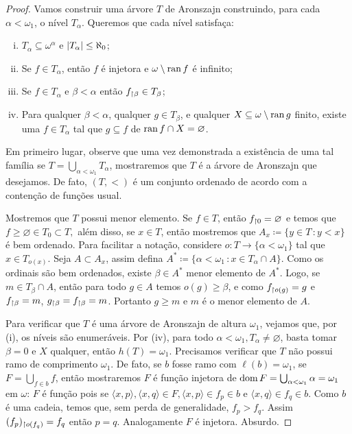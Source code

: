 \documentclass[a4paper]{article}
\begin{document}
\begin{proof}
  Vamos construir uma árvore \(T\) de Aronszajn construindo, para cada
  \(\alpha<\omega_1\), o nível \(T_\alpha\). Queremos que cada nível satisfaça:
  \begin{enumerate}[(i)]
    \item \(T_{\alpha} \subseteq \omega^{\alpha}\) e \(\vert T_{\alpha} \vert \le \aleph_0\);
    \item Se \(f \in T_{\alpha}\), então \(f\) é injetora e \(\omega\setminus \operatorname{ran} f\) é infinito;
    \item Se \(f \in T_{\alpha}\) e \(\beta < \alpha\) então \(f_{\upharpoonright \beta} \in T_{\beta}\);
    \item Para qualquer \(\beta < \alpha\), qualquer \(g \in T_{\beta}\), e
    qualquer \(X \subseteq \omega\setminus \operatorname{ran} g\) finito, existe uma \(f \in
    T_{\alpha}\) tal que \(g \subseteq f\) de \(\operatorname{ran} f \cap X = \varnothing\).
    \end{enumerate}

    Em primeiro lugar, observe que uma vez demonstrada a existência de uma tal
    família se \(T=\bigcup_{\alpha<\omega_1} T_\alpha\), mostraremos que \(T\) é
    a árvore  de Aronszajn que desejamos. De fato, \((T,<)\) é um conjunto
    ordenado de acordo com a contenção de funções usual.
    
    Mostremos que \(T\) possui menor elemento. Se \(f\in T\), então
    \(f_{\upharpoonright 0}=\varnothing\) e temos que \(f\geq\varnothing\in T_0\subset
    T,\) além disso,  se \(x\in T\), então mostremos que \(A_x\coloneqq\{y\in
    T\,\colon y<x\}\) é bem ordenado. Para facilitar a notação, considere
    \(o\colon T\rightarrow \{\alpha<\omega_1\}\) tal que \(x\in T_{o(x)}\). Seja
    \(A\subset A_x\), assim defina \(A^\ast\coloneqq \{\alpha<\omega_1\,\colon
    x\in T_\alpha\cap A\}\). 
    Como os ordinais são bem ordenados, existe \(\beta\in A^\ast\) menor
    elemento de \(A^\ast\).
    Logo, se \(m\in T_\beta\cap A\), então para todo \(g\in A\) temos
    \(o(g)\geq\beta\),  e como \(f_{\upharpoonright o(g)}=g\) e \(f_{\upharpoonright \beta}=m\),
    \(g_{\upharpoonright \beta}=f_{\upharpoonright \beta}=m\). Portanto \(g\geq m\) e \(m\) é o
    menor elemento de \(A\).
    
    Para verificar que \(T\) é uma árvore de Aronszajn de altura \(\omega_1\),
    vejamos que, por (i), os níveis são enumeráveis. Por (iv), para todo
    \(\alpha<\omega_1, T_\alpha\neq\varnothing\), basta tomar \(\beta=0\) e
    \(X\) qualquer,  então \(h(T)=\omega_1\). Precisamos verificar que \(T\) não
    possui ramo de comprimento \(\omega_1\). De fato, se \(b\) fosse ramo com
    \(\ell(b)=\omega_1\), se \(F=\bigcup_{f\in b} f\), então mostraremos \(F\) é
    função injetora de \(\operatorname{dom} F=\bigcup_{\alpha<\omega_1}\alpha=\omega_1\) em
    \(\omega\):  \(F\) é função pois se \(\langle x,p\rangle,\langle
    x,q\rangle\in F,  \langle x,p\rangle\in f_p\in b\) e \(\langle x,q\rangle\in
    f_q\in b\). Como \(b\) é uma cadeia, temos que, sem perda de generalidade,
    \(f_p>f_q\). Assim \((f_p)_{\upharpoonright o(f_q)}=f_q\) então \(p=q\). Analogamente
    \(F\) é injetora. Absurdo.
    

\end{proof}
\end{document}
